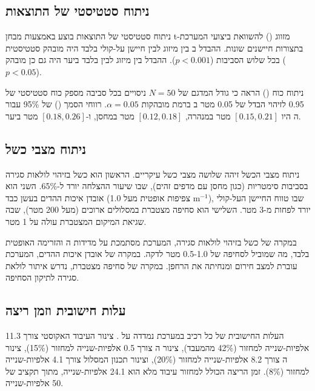 \subsection{ניתוח סטטיסטי של התוצאות}
\label{sec:ch08_statistical_analysis}

ניתוח סטטיסטי של התוצאות בוצע באמצעות מבחן t-מזווג () להשוואת ביצועי המערכת בתצורות חיישנים שונות. ההבדל ב בין מיזוג  לבין חיישן על-קולי בלבד היה מובהק סטטיסטית בכל שלוש הסביבות ($p < 0.001$). ההבדל בין מיזוג  לבין  בלבד ביער היה גם כן מובהק ($p < 0.05$). \cite{CrewAIDocs}

ניתוח כוח () הראה כי גודל המדגם של $N = 50$ ניסויים בכל סביבה מספק כוח סטטיסטי של 0.95 לזיהוי הבדל של 0.05 מטר ב ברמת מובהקות $\alpha = 0.05$. רווחי הסמך () של 95\% עבור ה היו $[0.15, 0.21]$ מטר במנהרה, $[0.12, 0.18]$ מטר במחסן, ו-$[0.18, 0.26]$ מטר ביער. \cite{Thrun2005ProbRobotics}

\subsection{ניתוח מצבי כשל}
\label{sec:ch08_failure_modes}

ניתוח מצבי הכשל זיהה שלושה מצבי כשל עיקריים. הראשון הוא כשל בזיהוי לולאות סגירה בסביבות סימטריות (כגון מחסן עם מדפים זהים), שבו שיעור ההצלחה יורד ל-65\%. השני הוא אובדן איכות ההדים בעשן כבד (צפיפות אופטית מעל 1.0 m$^{-1}$), שבו טווח החיישן העל-קולי יורד לפחות מ-3 מטר. השלישי הוא סחיפה מצטברת במסלולים ארוכים (מעל 200 מטר), שבה שגיאת המיקום המצטברת עולה על 1 מטר. \cite{CrewAIDocs}

במקרה של כשל בזיהוי לולאות סגירה, המערכת מסתמכת על מדידות ה והזרימה האופטית בלבד, מה שמוביל לסחיפה של 0.5-1.0 מטר לדקה. במקרה של אובדן איכות ההדים, המערכת עוברת למצב חירום ומנחיתה את הרחפן. במקרה של סחיפה מצטברת, נדרש איתור לולאת סגירה לתיקון הסחיפה. \cite{Thrun2005ProbRobotics}

\subsection{עלות חישובית וזמן ריצה}
\label{sec:ch08_computational_cost}

העלות החישובית של כל רכיב במערכת נמדדה על . צינור העיבוד האקוסטי צורך 11.3 אלפיות-שנייה למחזור (42\% מהמעבד), צינור ה צורך 0.5 אלפיות-שנייה למחזור (15\%), צינור ה צורך 8.2 אלפיות-שנייה למחזור (20\%), וצינור תכנון המסלול צורך 4.1 אלפיות-שנייה למחזור (8\%). זמן הריצה הכולל למחזור עיבוד מלא הוא 24.1 אלפיות-שנייה, מתוך תקציב של 50 אלפיות-שנייה. \cite{CrewAIDocs}

